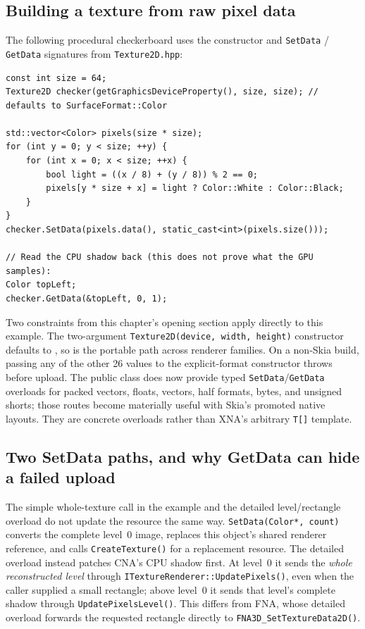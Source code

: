 \subsection{Building a texture from raw pixel data}

The following procedural checkerboard uses the constructor and \texttt{SetData} /
\texttt{GetData} signatures from \texttt{Texture2D.hpp}:

\begin{lstlisting}
const int size = 64;
Texture2D checker(getGraphicsDeviceProperty(), size, size); // defaults to SurfaceFormat::Color

std::vector<Color> pixels(size * size);
for (int y = 0; y < size; ++y) {
    for (int x = 0; x < size; ++x) {
        bool light = ((x / 8) + (y / 8)) % 2 == 0;
        pixels[y * size + x] = light ? Color::White : Color::Black;
    }
}
checker.SetData(pixels.data(), static_cast<int>(pixels.size()));

// Read the CPU shadow back (this does not prove what the GPU samples):
Color topLeft;
checker.GetData(&topLeft, 0, 1);
\end{lstlisting}

Two constraints from this chapter's opening section apply directly to this example. The
two-argument \texttt{Texture2D(device, width, height)} constructor defaults to
, so  is the portable path across renderer
families. On a non-Skia build, passing any of the other 26  values to
the explicit-format constructor throws before upload. The public class does now provide typed
\texttt{SetData}/\texttt{GetData} overloads for packed vectors, floats, vectors, half formats,
bytes, and unsigned shorts; those routes become materially useful with Skia's promoted native
layouts. They are concrete overloads rather than XNA's arbitrary \texttt{T[]} template.

\subsection{Two SetData paths, and why GetData can hide a failed upload}
\label{sec:texture2d-update-contract}

The simple whole-texture call in the example and the detailed level/rectangle overload do
not update the resource the same way. \texttt{SetData(Color*, count)} converts the complete
level~0 image, replaces this object's shared renderer reference, and calls
\texttt{CreateTexture()} for a replacement resource. The detailed overload instead patches
CNA's CPU shadow first. At level~0 it sends the \emph{whole reconstructed level} through
\texttt{ITextureRenderer::UpdatePixels()}, even when the caller supplied a small rectangle;
above level~0 it sends that level's complete shadow through
\texttt{UpdatePixelsLevel()}. This differs from FNA, whose detailed overload forwards the
requested rectangle directly to \texttt{FNA3D\_SetTextureData2D()}.

